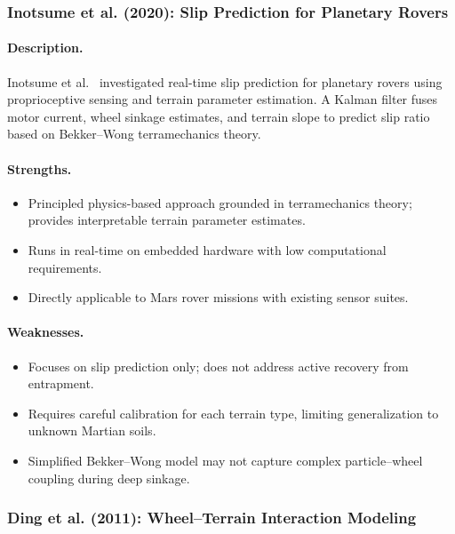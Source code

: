 \documentclass[12pt,a4paper]{article}
\begin{document}
\subsubsection{Inotsume et al. (2020): Slip Prediction for Planetary Rovers}

\paragraph{Description.} Inotsume et al.~\cite{inotsume2020} investigated real-time slip prediction for planetary rovers using proprioceptive sensing and terrain parameter estimation. A Kalman filter fuses motor current, wheel sinkage estimates, and terrain slope to predict slip ratio based on Bekker--Wong terramechanics theory.

\paragraph{Strengths.}
\begin{itemize}
    \item Principled physics-based approach grounded in terramechanics theory; provides interpretable terrain parameter estimates.
    \item Runs in real-time on embedded hardware with low computational requirements.
    \item Directly applicable to Mars rover missions with existing sensor suites.
\end{itemize}

\paragraph{Weaknesses.}
\begin{itemize}
    \item Focuses on slip prediction only; does not address active recovery from entrapment.
    \item Requires careful calibration for each terrain type, limiting generalization to unknown Martian soils.
    \item Simplified Bekker--Wong model may not capture complex particle--wheel coupling during deep sinkage.
\end{itemize}


\subsubsection{Ding et al. (2011): Wheel--Terrain Interaction Modeling}
\end{document}
